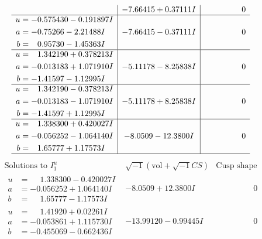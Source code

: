 \documentclass[1p]{elsarticle_modified}
\theoremstyle{definition}
\newcommand{\I}{\sqrt{-1}}
\begin{document}
$$\begin{array}{c|c|c}
 & -7.66415 + 0.37111 I & \phantom{-0.000000 } 0 \\ \hline\begin{aligned}
u &= -0.575430 - 0.191897 I \\
a &= -0.75266 - 2.21488 I \\
b &= \phantom{-}0.95730 - 1.45363 I\end{aligned}
 & -7.66415 - 0.37111 I & \phantom{-0.000000 } 0 \\ \hline\begin{aligned}
u &= \phantom{-}1.342190 + 0.378213 I \\
a &= -0.013183 + 1.071910 I \\
b &= -1.41597 - 1.12995 I\end{aligned}
 & -5.11178 - 8.25838 I & \phantom{-0.000000 } 0 \\ \hline\begin{aligned}
u &= \phantom{-}1.342190 - 0.378213 I \\
a &= -0.013183 - 1.071910 I \\
b &= -1.41597 + 1.12995 I\end{aligned}
 & -5.11178 + 8.25838 I & \phantom{-0.000000 } 0 \\ \hline\begin{aligned}
u &= \phantom{-}1.338300 + 0.420027 I \\
a &= -0.056252 - 1.064140 I \\
b &= \phantom{-}1.65777 + 1.17573 I\end{aligned}
 & -8.0509 - 12.3800 I & \phantom{-0.000000 } 0\\
 \hline 
 \end{array}$$\newpage$$\begin{array}{c|c|c}  
\text{Solutions to }I^u_{1}& \I (\text{vol} + \sqrt{-1}CS) & \text{Cusp shape}\\
 \hline 
\begin{aligned}
u &= \phantom{-}1.338300 - 0.420027 I \\
a &= -0.056252 + 1.064140 I \\
b &= \phantom{-}1.65777 - 1.17573 I\end{aligned}
 & -8.0509 + 12.3800 I & \phantom{-0.000000 } 0 \\ \hline\begin{aligned}
u &= \phantom{-}1.41920 + 0.02261 I \\
a &= -0.053861 + 1.115730 I \\
b &= -0.455069 - 0.662436 I\end{aligned}
 & -13.99120 - 0.99445 I & \phantom{-0.000000 } 0 \\ \hline\begin{aligned}

\end{aligned}
\end{array}$$
\end{document}
